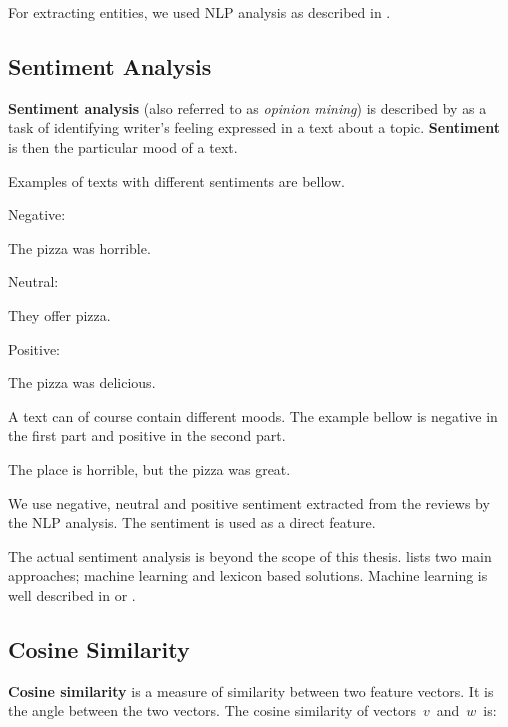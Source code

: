 For extracting entities, we used NLP analysis as described in .


\subsection{Sentiment Analysis}

\textbf{Sentiment analysis} (also referred to as \textit{opinion mining}) is described by \citet{melville2009sentiment} 
as a task of identifying writer's feeling expressed in a text about a topic.
\textbf{Sentiment} is then the particular mood of a text.

Examples of texts with different sentiments are bellow.

Negative:

\begin{code}
The pizza was horrible.
\end{code}

Neutral:

\begin{code}
They offer pizza.
\end{code}

Positive:

\begin{code}
The pizza was delicious.
\end{code}

A text can of course contain different moods.
The example bellow is negative in the first part and positive in the second part.

\begin{code}
The place is horrible, but the pizza was great.
\end{code}

We use negative, neutral and positive sentiment extracted from the reviews by the NLP analysis.
The sentiment is used as a direct feature.

The actual sentiment analysis is beyond the scope of this thesis.
\citet{kaushik2014scalable} lists two main approaches; machine learning and lexicon based solutions.
Machine learning is well described in \citet{melville2009sentiment} or \citet{xia2011ensemble}.

\subsection{Cosine Similarity}

\textbf{Cosine similarity} is a measure of similarity between two feature vectors.
It is the angle between the two vectors.
The cosine similarity of vectors~$v$~and~$w$~is:

